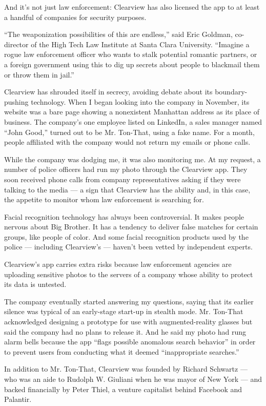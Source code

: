 And it's not just law enforcement: Clearview has also licensed the app
to at least a handful of companies for security purposes.

``The weaponization possibilities of this are endless,'' said Eric
Goldman, co-director of the High Tech Law Institute at Santa Clara
University. ``Imagine a rogue law enforcement officer who wants to stalk
potential romantic partners, or a foreign government using this to dig
up secrets about people to blackmail them or throw them in jail.''

Clearview has shrouded itself in secrecy, avoiding debate about its
boundary-pushing technology. When I began looking into the company in
November, its website was a bare page showing a nonexistent Manhattan
address as its place of business. The company's one employee listed on
LinkedIn, a sales manager named ``John Good,'' turned out to be Mr.
Ton-That, using a fake name. For a month, people affiliated with the
company would not return my emails or phone calls.

While the company was dodging me, it was also monitoring me. At my
request, a number of police officers had run my photo through the
Clearview app. They soon received phone calls from company
representatives asking if they were talking to the media --- a sign that
Clearview has the ability and, in this case, the appetite to monitor
whom law enforcement is searching for.

Facial recognition technology has always been controversial. It makes
people nervous about Big Brother. It has a tendency to deliver false
matches for certain groups, like people of color. And some facial
recognition products used by the police --- including Clearview's ---
haven't been vetted by independent experts.

Clearview's app carries extra risks because law enforcement agencies are
uploading sensitive photos to the servers of a company whose ability to
protect its data is untested.

The company eventually started answering my questions, saying that its
earlier silence was typical of an early-stage start-up in stealth mode.
Mr. Ton-That acknowledged designing a prototype for use with
augmented-reality glasses but said the company had no plans to release
it. And he said my photo had rung alarm bells because the app ``flags
possible anomalous search behavior'' in order to prevent users from
conducting what it deemed ``inappropriate searches.''

In addition to Mr. Ton-That, Clearview was founded by Richard Schwartz
--- who was an aide to Rudolph W. Giuliani when he was mayor of New York
--- and backed financially by Peter Thiel, a venture capitalist behind
Facebook and Palantir.

